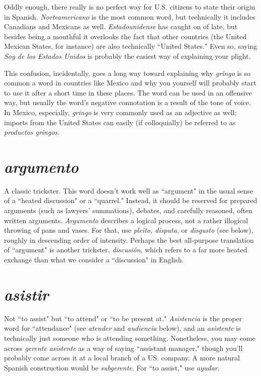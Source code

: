 Oddly enough, there really is no perfect way for U.S. citizens
to state their origin in Spanish. \emph{Norteamericano} is the most common
word, but technically it includes Canadians and Mexicans as well. \emph{Estadounidense} has caught on of late, but besides being a mouthful it
overlooks the fact that other countries (the United Mexican States, for
instance) are also technically ``United States." Even so, saying \emph{Soy de
los Estados Unidos} is probably the easiest way of explaining your
plight.

This confusion, incidentally, goes a long way toward explaining why \emph{gringo} is so common a word in countries like Mexico and why
you yourself will probably start to use it after a short time in these
places. The word can be used in an offensive way, but usually the
word's negative connotation is a result of the tone of voice. In Mexico,
especially, \emph{gringo} is very commonly used as an adjective as well; imports from the United States can easily (if colloquially) be referred to
as \emph{productos gringos}.

\section{\emph{argumento}}

A classic trickster. This word doesn't work
well as ``argument" in the usual sense of a ``heated discussion" or a
``quarrel." Instead, it should be reserved for prepared arguments (such
as lawyers' summations), debates, and carefully reasoned, often written
arguments. \emph{Argumento} describes a logical process, not a rather illogical throwing of pans and vases. For that, use \emph{pleito, disputa}, or \emph{disgusto} (see below), roughly in descending order of intensity. Perhaps the
best all-purpose translation of ``argument" is another trickster, \emph{discusión}, which refers to a far more heated exchange than what we consider a ``discussion" in English.

\section{\emph{asistir}}

Not ``to assist" but ``to attend" or ``to be present at."
\emph{Asistencia} is the proper word for ``attendance" (see \emph{atender} and \emph{audiencia} below), and an \emph{asistente} is technically just someone who is attending something. Nonetheless, you may come across \emph{gerente asistente} as a way of saying ``assistant manager," though you'll probably
come across it at a local branch of a US. company. A more natural
Spanish construction would be \emph{subgerente}. For ``to assist," use \emph{ayudar}.

